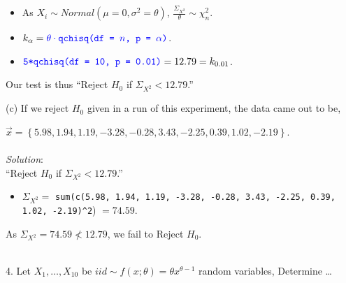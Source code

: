 \documentclass[12pt]{article}
\newcommand{\XB}{\color{black}}
\newcommand{\XBB}{\color{blue}}
\newcommand{\ds}{\displaystyle}
\begin{document}
\begin{itemize}
    \item As $ X_{i} \sim Normal(\mu=0, \sigma^{2}=\theta) $, $\ds \frac{\Sigma_{X^{2}}}{\theta} \sim \chi^{2}_{n} $.
    \item $ \ds k_{\alpha} = {\XBB \theta \cdot \texttt{qchisq(df = $ n $, p = $ \alpha $)}} $.
    \item $ \ds {\XBB \texttt{5*qchisq(df = 10, p = 0.01)}} = 12.79 = k_{0.01} $.
\end{itemize}

\noindent
Our test is thus ``Reject $ H_{0} $ if $ \Sigma_{X^{2}} < 12.79 $.'' \\

\vspace{2.5mm}

(c) If we reject $ H_{0} $ given in a run of this experiment, the data came out to be,

$ \overrightarrow{x}  = \left\{ 5.98, 1.94, 1.19, -3.28, -0.28, 3.43, -2.25, 0.39, 1.02, -2.19 \right\} $. \\
\vspace{2.5mm} \\
\textit{Solution}:
\vspace{2.5mm} \\

\noindent
``Reject $ H_{0} $ if $ \Sigma_{X^{2}} < 12.79 $.''

\begin{itemize}
    \item $ \ds \Sigma_{X^{2}} = $ {\XBB \texttt{sum(c(5.98, 1.94, 1.19, -3.28, -0.28, 3.43, -2.25, 0.39, 1.02, -2.19)}\verb|^|\texttt{2})} $ = 74.59 $.
\end{itemize}
As $ \Sigma_{X^{2}} = 74.59 \nless 12.79 $, we fail to Reject $ H_{0} $. \\

\vspace{2.5mm}

\newpage
\XBB\hrulefill\XB \\

4. Let $ X_{1}, \dots , X_{10} $ be $ iid \sim f(x; \theta) = \theta x^{\theta - 1} $ random variables, Determine \dots \\
\end{document}
